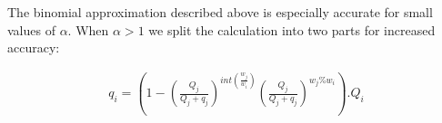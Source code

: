 \documentclass[11pt]{amsart}
\begin{document}
The binomial approximation described above is especially accurate for small values of $\alpha$. When $\alpha>1$ we split the calculation into two parts for increased accuracy:

\begin{equation}
\begin{gathered}
q_i = \left(1 - \left(\frac{Q_j}{Q_j+q_j}\right)^{int\left(\frac{w_j}{w_i}\right)}\left(\frac{Q_j}{Q_j+q_j}\right)^{w_j\%w_i}\right).Q_i
\end{gathered}
\end{equation}
\end{document}
